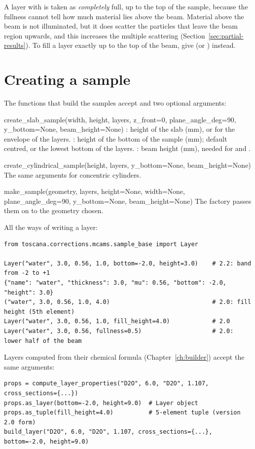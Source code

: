 \begin{warn}
A layer with  is taken as \emph{completely} full, up to the top of the sample, because the fullness
cannot tell how much material lies above the beam. Material above the beam is not illuminated, but it does scatter the
particles that leave the beam region upwards, and this increases the multiple scattering (Section~\ref{sec:partial-results}).
To fill a layer exactly up to the top of the beam, give  (or ) instead.
\end{warn}

\section{Creating a sample}

The functions that build the samples accept  and two optional arguments:

\begin{fnbox}{create\_slab\_sample(width, height, layers, z\_front=0, plane\_angle\_deg=90, y\_bottom=None, beam\_height=None)}
: height of the slab (mm), or  for the envelope of the layers.
: height of the bottom of the sample (mm); default centred, or the lowest bottom of the layers.
: beam height (mm), needed for  and .
\end{fnbox}
\begin{fnbox}{create\_cylindrical\_sample(height, layers, y\_bottom=None, beam\_height=None)}
The same arguments for concentric cylinders.
\end{fnbox}
\begin{fnbox}{make\_sample(geometry, layers, height=None, width=None, plane\_angle\_deg=90, y\_bottom=None, beam\_height=None)}
The factory passes them on to the geometry chosen.
\end{fnbox}

All the ways of writing a layer:
\begin{lstlisting}
from toscana.corrections.mcams.sample_base import Layer

Layer("water", 3.0, 0.56, 1.0, bottom=-2.0, height=3.0)    # 2.2: band from -2 to +1
{"name": "water", "thickness": 3.0, "mu": 0.56, "bottom": -2.0, "height": 3.0}
("water", 3.0, 0.56, 1.0, 4.0)                             # 2.0: fill height (5th element)
Layer("water", 3.0, 0.56, 1.0, fill_height=4.0)            # 2.0
Layer("water", 3.0, 0.56, fullness=0.5)                    # 2.0: lower half of the beam
\end{lstlisting}
Layers computed from their chemical formula (Chapter~\ref{ch:builder}) accept the same arguments:
\begin{lstlisting}
props = compute_layer_properties("D2O", 6.0, "D2O", 1.107, cross_sections={...})
props.as_layer(bottom=-2.0, height=9.0)  # Layer object
props.as_tuple(fill_height=4.0)          # 5-element tuple (version 2.0 form)
build_layer("D2O", 6.0, "D2O", 1.107, cross_sections={...}, bottom=-2.0, height=9.0)
\end{lstlisting}

